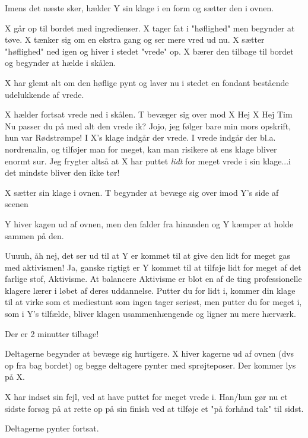 \documentclass[a4paper,11pt]{article}
\begin{document}
\begin{sketch}
\scene Imens det næste sker, hælder Y sin klage i en form og sætter den i ovnen.

\scene X går op til bordet med ingredienser.
X tager fat i "høflighed" men begynder at tøve. X tænker sig om en ekstra gang og ser mere vred ud nu. X sætter "høflighed" ned igen og hiver i stedet "vrede" op. X bærer den tilbage til bordet og begynder at hælde i skålen. 


 X har glemt alt om den høflige pynt og laver nu i stedet en fondant bestående udelukkende af vrede.

\scene X hælder fortsat vrede ned i skålen. T bevæger sig over mod X
 Hej X
 Hej Tim
 Nu passer du på med alt den vrede ik?
 Jojo, jeg følger bare min mors opskrift, hun var Rødstrømpe!
 I X's klage indgår der vrede. I vrede indgår der bl.a. nordrenalin, og tilføjer man for meget, kan man risikere at ens klage bliver enormt sur. 
  Jeg frygter altså at X har puttet \textit{lidt} for meget vrede i sin klage...i det mindste bliver den ikke tør!

\scene X sætter sin klage i ovnen. T begynder at bevæge sig over imod Y's side af scenen

\scene Y hiver kagen ud af ovnen, men den falder fra hinanden og Y kæmper at holde sammen på den.

  Uuuuh, åh nej, det ser ud til at Y er kommet til at give den lidt for meget gas med aktivismen! 
 Ja, ganske rigtigt er Y kommet til at tilføje lidt for meget af det farlige stof, Aktivisme. At balancere Aktivisme er blot en af de ting professionelle klagere lærer i løbet af deres uddannelse. Putter du for lidt i, kommer din klage til at virke som et mediestunt som ingen tager seriøst, men putter du for meget i, som i Y's tilfælde, bliver klagen usammenhængende og ligner nu mere hærværk.  

 Der er 2 minutter tilbage! 

\scene Deltagerne begynder at bevæge sig hurtigere. X hiver kagerne ud af ovnen (dvs op fra bag bordet) og begge deltagere pynter med sprøjteposer. Der kommer lys på X.

 X har indset sin fejl, ved at have puttet for meget vrede i. Han/hun gør nu et sidste forsøg på at rette op på sin finish ved at tilføje et "på forhånd tak" til sidst. 


\scene Deltagerne pynter fortsat.


\end{sketch}
\end{document}
